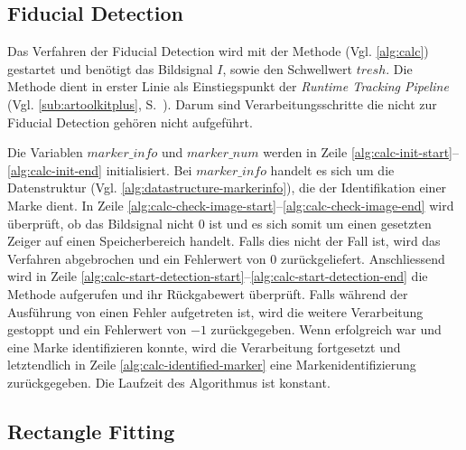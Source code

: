 

\subsection{Fiducial Detection} %
\label{sec:fiducial_detection}

Das Verfahren der Fiducial Detection wird mit der Methode  (Vgl. \autoref{alg:calc}) gestartet und
 benötigt das Bildsignal $I$, sowie den Schwellwert $\mathit{tresh}$. Die Methode  dient in erster
 Linie als Einstiegspunkt der \textit{Runtime Tracking Pipeline} (Vgl. \autoref{sub:artoolkitplus},
 S.~\pageref{sub:artoolkitplus}). Darum sind Verarbeitungsschritte die nicht zur Fiducial Detection gehören nicht
 aufgeführt.



Die Variablen $\mathit{marker\_info}$ und $\mathit{marker\_num}$ werden in Zeile
 \ref{alg:calc-init-start}--\ref{alg:calc-init-end} initialisiert. Bei $\mathit{marker\_info}$ handelt es sich um die
 Datenstruktur  (Vgl. \autoref{alg:datastructure-markerinfo}), die der Identifikation einer Marke
 dient. In Zeile \ref{alg:calc-check-image-start}--\ref{alg:calc-check-image-end} wird überprüft, ob das Bildsignal
 nicht $0$ ist und es sich somit um einen gesetzten Zeiger auf einen Speicherbereich handelt. Falls dies nicht der Fall
 ist, wird das Verfahren abgebrochen und ein Fehlerwert von $0$ zurückgeliefert. Anschliessend wird in Zeile
 \ref{alg:calc-start-detection-start}--\ref{alg:calc-start-detection-end} die Methode 
 aufgerufen und ihr Rückgabewert überprüft. Falls während der Ausführung von  einen Fehler
 aufgetreten ist, wird die weitere Verarbeitung gestoppt und ein Fehlerwert von $-1$ zurückgegeben. Wenn
  erfolgreich war und eine Marke identifizieren konnte, wird die Verarbeitung fortgesetzt und
 letztendlich in Zeile \ref{alg:calc-identified-marker} eine Markenidentifizierung zurückgegeben. Die Laufzeit des
 Algorithmus ist konstant.


\subsection{Rectangle Fitting} %
\label{sec:rectangle_fitting}



